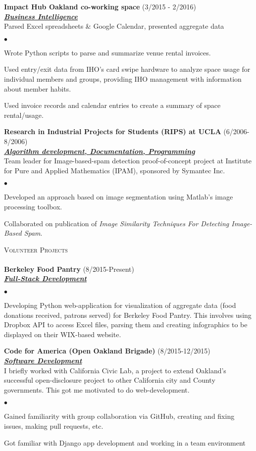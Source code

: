 \documentclass{article}
\newcommand{\lineunder}{\vspace*{-8pt} \\ \hspace*{-18pt} \hrulefill \\}
\newcommand{\header}[1]{{\hspace*{-15pt}\vspace*{6pt} \textsc{#1}} \vspace*{-6pt} \lineunder}
\newcommand{\employer}[3]{{ \textbf{#1} (#2)\\ \underline{\textbf{\emph{#3}}}\\  }}
\newenvironment{achievements}{\begin{list}{$\bullet$}{\topsep 0pt \itemsep -2pt}}{\vspace*{4pt}\end{list}}
\begin{document}
\employer{Impact Hub Oakland co-working space}{3/2015 - 2/2016}{Business Intelligence}
Parsed Excel spreadsheets \& Google Calendar, presented aggregate data
\begin{achievements}
\item Wrote Python scripts to parse and summarize venue rental invoices.
\item Used entry/exit data from IHO's card swipe hardware to analyze space usage for individual members and groups, providing IHO management with information about member habits.
\item Used invoice records and calendar entries to create a summary of space rental/usage.
\end{achievements}



\employer{Research in Industrial Projects for Students (RIPS) at UCLA}{6/2006-8/2006}{Algorithm development, Documentation, Programming}
Team leader for Image-based-spam detection proof-of-concept project at  Institute for Pure and Applied Mathematics (IPAM), sponsored by Symantec Inc.
	\begin{achievements}
	\item Developed an approach based on image segmentation using Matlab's image processing toolbox.
	\item Collaborated on publication of \emph{Image Similarity Techniques For Detecting Image-Based Spam}.
\end{achievements}

\header{Volunteer Projects}
\employer{Berkeley Food Pantry}{8/2015-Present}{Full-Stack Development}
\begin{achievements}
\item Developing Python web-application for visualization of aggregate data (food donations received, patrons served) for Berkeley Food Pantry. This involves using Dropbox API to access Excel files, parsing them and creating infographics to be displayed on their WIX-based website. 
\end{achievements}

\employer{Code for America (Open Oakland Brigade)}{8/2015-12/2015}{Software Development}
I briefly worked with California Civic Lab, a project to extend Oakland's successful open-disclosure project to other California city and County governments.  This got me motivated to do web-development.
\begin{achievements}
\item Gained familiarity with group collaboration via GitHub, creating and fixing issues, making pull requests, etc.
\item Got familiar with Django app development and working in a team environment
\end{achievements}
\end{document}
